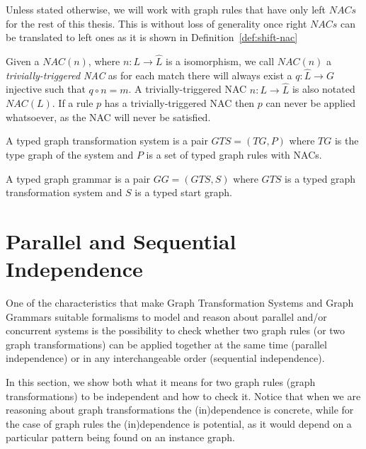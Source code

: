 \begin{assumption} Unless stated otherwise, we will work with graph rules that have only left $NACs$ for the rest of this thesis. This is without loss of generality once right $NACs$ can be translated to left ones as it is shown in Definition~\ref{def:shift-nac}
\end{assumption}

\begin{definition}Given a $NAC(n)$, where $n : L \rightarrow \hat{L}$ is a isomorphism, we call $NAC(n)$ a \emph{trivially-triggered NAC} as for each match \match{} there will always exist a $q : \hat{L} \rightarrow G$ injective such that $q \circ n = m$.
  A trivially-triggered NAC $n : L \rightarrow \hat{L}$ is also notated $NAC(L)$. If a rule $p$ has a trivially-triggered NAC then $p$ can never be applied whatsoever, as the NAC will never be satisfied.
\end{definition}

\begin{definition}  A typed graph transformation system is a pair $GTS = \left(TG,P\right)$ where $TG$ is the type graph of the system and $P$ is a set of typed graph rules with NACs.

  A typed graph grammar is a pair $GG = \left(GTS,S\right)$ where $GTS$ is a typed graph transformation system and $S$ is a typed start graph.
\end{definition}

\section{Parallel and Sequential Independence}

One of the characteristics that make Graph Transformation Systems and Graph Grammars suitable formalisms to model and reason about parallel and/or concurrent systems is the possibility to check whether two graph rules (or two graph transformations) can be applied together at the same time (parallel independence) or in any interchangeable order (sequential independence).

In this section, we show both what it means for two graph rules (graph transformations) to be independent and how to check it. Notice that when we are reasoning about graph transformations the (in)dependence is concrete, while for the case of graph rules the (in)dependence is potential, as it would depend on a particular pattern being found on an instance graph.

